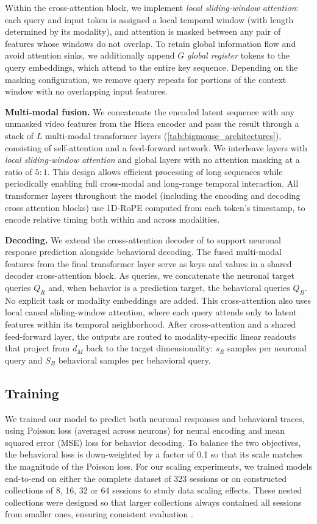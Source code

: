 \documentclass{article} %
\begin{document}
Within the cross-attention block, we implement \textit{local sliding-window attention}: each query and input token is assigned a local temporal window (with length determined by its modality), and attention is masked between any pair of features whose windows do not overlap. To retain global information flow and avoid attention sinks, we additionally append $G$ \textit{global register} tokens \citep{darcet2023vision} to the query embeddings, which attend to the entire key sequence. Depending on the masking configuration, we remove query repeats for portions of the context window with no overlapping input features.

\textbf{Multi-modal fusion.} We concatenate the encoded latent sequence with any unmasked video features from the Hiera encoder and pass the result through a stack of $L$ multi-modal transformer layers (\cref{tab:bigmouse_architectures}), consisting of self-attention and a feed-forward network. We interleave layers with \textit{local sliding-window attention} and global layers with no attention masking at a ratio of $5{:}1$. This design allows efficient processing of long sequences while periodically enabling full cross-modal and long-range temporal interaction. All transformer layers throughout the model (including the encoding and decoding cross attention blocks) use 1D-RoPE \citep{su2024roformer} computed from each token's timestamp, to encode relative timing both within and across modalities. 

\textbf{Decoding.} We extend the cross-attention decoder of \citet{poyov2iclr2025} to support neuronal response prediction alongside behavioral decoding. The fused multi-modal features from the final transformer layer serve as keys and values in a shared decoder cross-attention block. As queries, we concatenate the neuronal target queries $Q_R$ and, when behavior is a prediction target, the behavioral queries $Q_B$. No explicit task or modality embeddings are added. This cross-attention also uses local causal sliding-window attention, where each query attends only to latent features within its temporal neighborhood. After cross-attention and a shared feed-forward layer, the outputs are routed to modality-specific linear readouts that project from $d_M$ back to the target dimensionality: $s_R$
samples per neuronal query and $S_B$ behavioral samples per behavioral query.


\subsection{Training}
We trained our model to predict both neuronal responses and behavioral traces, using Poisson loss (averaged across neurons) for neural encoding and mean squared error (MSE) loss for behavior decoding. To balance the two objectives, the behavioral loss is down-weighted by a factor of 0.1 so that its scale matches the magnitude of the Poisson loss.
For our scaling experiments, we trained models end-to-end on either the complete dataset of 323 sessions or on constructed collections of 8, 16, 32 or 64 sessions to study data scaling effects. These nested collections were designed so that larger collections always contained all sessions from smaller ones, ensuring consistent evaluation . 
\end{document}

